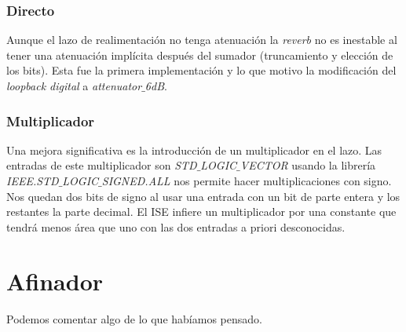 		\subsubsection{Directo} 
		Aunque el lazo de realimentación no tenga atenuación la \emph{reverb} no es inestable al tener una atenuación implícita después del sumador (truncamiento y elección de los bits). Esta fue la primera implementación y lo que motivo la modificación del \emph{loopback digital} a \emph{attenuator$\_$6dB}.
		
		\subsubsection{Multiplicador}
		Una mejora significativa es la introducción de un multiplicador en el lazo. Las entradas de este multiplicador son \emph{STD$\_$LOGIC$\_$VECTOR} usando la librería \emph{IEEE.STD$\_$LOGIC$\_$SIGNED.ALL} nos permite hacer multiplicaciones con signo. Nos quedan dos bits de signo al usar una entrada con un bit de parte entera y los restantes la parte decimal. El ISE infiere un multiplicador por una constante que tendrá menos área que uno con las dos entradas a priori desconocidas.



\section{Afinador}
	Podemos comentar algo de lo que habíamos pensado.

	



